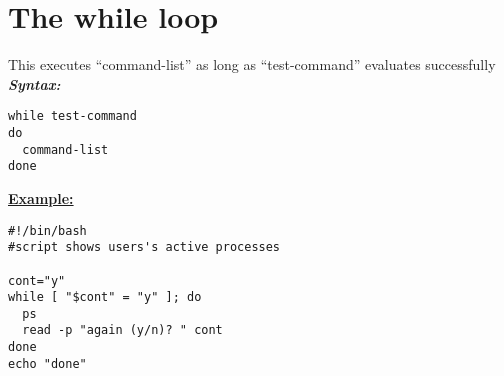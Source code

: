 \documentclass{report}
\begin{document}
\section{The while loop}
This executes ``command-list'' as long as ``test-command'' evaluates successfully
\bigbreak \noindent
\textit{\textbf{Syntax:}}
\begin{verbatim}
while test-command
do
  command-list
done
\end{verbatim}
\bigbreak \noindent
\textbf{\underline{Example:}}
\begin{mdframed}
\begin{verbatim}
#!/bin/bash
#script shows users's active processes

cont="y"
while [ "$cont" = "y" ]; do
  ps
  read -p "again (y/n)? " cont
done
echo "done"

\end{verbatim}
\end{mdframed}
\end{document}
